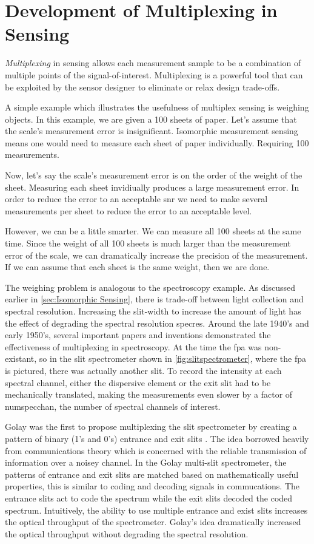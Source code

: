 \section{Development of Multiplexing in Sensing}

\emph{Multiplexing} in sensing allows each measurement sample to be a combination of multiple points of the signal-of-interest. Multiplexing is a powerful tool that can be exploited by the sensor designer to eliminate or relax design trade-offs. 

A simple example which illustrates the usefulness of multiplex sensing is weighing objects. In this example, we are given a 100 sheets of paper. Let's assume that the scale's measurement error is insignificant. Isomorphic measurement sensing means one would need to measure each sheet of paper individually. Requiring 100 measurements. 

Now, let's say the scale's measurement error is on the order of the weight of the sheet. Measuring each sheet invidiually produces a large measurement error. In order to reduce the error to an acceptable \gls{snr} we need to make several measurements per sheet to reduce the error to an acceptable level.

However, we can be a little smarter. We can measure all 100 sheets at the same time. Since the weight of all 100 sheets is much larger than the measurement error of the scale, we can dramatically increase the precision of the measurement. If we can assume that each sheet is the same weight, then we are done. 

The weighing problem is analogous to the spectroscopy example. As discussed earlier in \autoref{sec:Isomorphic Sensing}, there is trade-off between light collection and spectral resolution. Increasing the slit-width to increase the amount of light has the effect of degrading the spectral resolution \gls{specres}. Around the late 1940's and early 1950's, several important papers and inventions demonstrated the effectiveness of multiplexing in spectroscopy. At the time the \gls{fpa} was non-existant, so in the slit spectrometer shown in \ref{fig:slitspectrometer}, where the \gls{fpa} is pictured, there was actually another slit. To record the intensity at each spectral channel, either the dispersive element or the exit slit had to be mechanically translated, making the measurements even slower by a factor of \gls{numspecchan}, the number of spectral channels of interest. 

Golay was the first to propose multiplexing the slit spectrometer by creating a pattern of binary (1's and 0's) entrance and exit slits \cite{golay1949multi}. The idea borrowed heavily from communications theory which is concerned with the reliable transmission of information over a noisey channel. In the Golay multi-slit spectrometer, the patterns of entrance and exit slits are matched based on mathematically useful properties, this is similar to coding and decoding signals in commucations. The entrance slits act to code the spectrum while the exit slits decoded the coded spectrum. Intuitively, the ability to use multiple entrance and exist slits increases the optical throughput of the spectrometer. Golay's idea dramatically increased the optical throughput without degrading the spectral resolution. 


